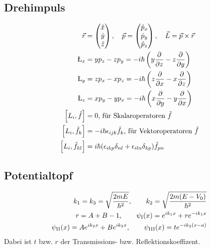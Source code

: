 \documentclass[landscape,8pt]{scrartcl}
\begin{document}
\begin{multicols}{3}
\subsection{Drehimpuls}
\begin{align*}
\vec r 	&= \begin{pmatrix}\hat x\\\hat y\\\hat z\end{pmatrix},
\quad \vec p 	= \begin{pmatrix}\hat p_x\\\hat p_y\\\hat p_z\end{pmatrix},
\quad \vec L = \vec p \times \vec r \\
%
\L_x 	&= yp_z - zp_y = -i\hbar \left( y\frac{\partial}{\partial z}-z\frac{\partial}{\partial y}\right) \\
%
\L_y 	&= zp_x - xp_z = -i\hbar \left( z\frac{\partial}{\partial x}-x\frac{\partial}{\partial z}\right) \\
%
\L_z 	&= xp_y - yp_x = -i\hbar \left( x\frac{\partial}{\partial y}-y\frac{\partial}{\partial x}\right)\\
\left[L_i,\hat f\right] &= 0 \text{, für Skalaroperatoren $\hat f$} \\
\left[L_i,\hat f_k\right] &= -i\hbar \epsilon_{ijk}\hat f_k \text{, für Vektoroperatoren $\hat f$} \\
\left[L_i,\hat f_{kl}\right] &= i\hbar (\epsilon_{ikp}\delta_{nl}+\epsilon_{iln}\delta_{kp})\hat f_{pn}
\end{align*}


\subsection{Potentialtopf}
\begin{align*}
k_1 = k_3 = \sqrt{\frac{2mE}{\hbar^2}}, \qquad k_2 = \sqrt{\frac{2m(E-V_0)}{\hbar^2}} \\
r = A+B-1, \qquad \psi_\text I(x) = e^{ik_1x} + re^{-ik_1x} \\
\psi_\text{II}(x) = Ae^{ik_2x} + Be^{ik_2x}, \qquad \psi_\text{III}(x) = t e^{-ik_3(x-a)}
\end{align*}
Dabei ist $t$ bzw. $r$ der Transmissions- bzw. Reflektionskoeffizent. 


\end{multicols}
\end{document}
